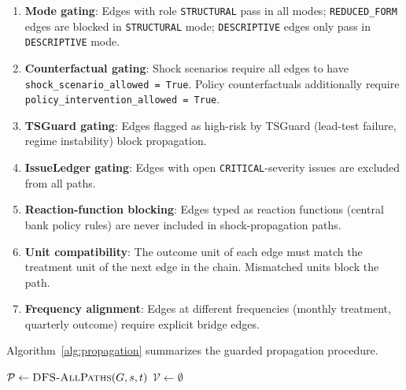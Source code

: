 \documentclass{article}
\begin{document}
\begin{enumerate}[leftmargin=*, itemsep=1pt]
    \item \textbf{Mode gating}: Edges with role \texttt{STRUCTURAL} pass in all modes; \texttt{REDUCED\_FORM} edges are blocked in \texttt{STRUCTURAL} mode; \texttt{DESCRIPTIVE} edges only pass in \texttt{DESCRIPTIVE} mode.

    \item \textbf{Counterfactual gating}: Shock scenarios require all edges to have \texttt{shock\_scenario\_allowed = True}. Policy counterfactuals additionally require \texttt{policy\_intervention\_allowed = True}.

    \item \textbf{TSGuard gating}: Edges flagged as high-risk by TSGuard (\eg lead-test failure, regime instability) block propagation.

    \item \textbf{IssueLedger gating}: Edges with open \texttt{CRITICAL}-severity issues are excluded from all paths.

    \item \textbf{Reaction-function blocking}: Edges typed as reaction functions (\eg central bank policy rules) are never included in shock-propagation paths.

    \item \textbf{Unit compatibility}: The outcome unit of each edge must match the treatment unit of the next edge in the chain. Mismatched units block the path.

    \item \textbf{Frequency alignment}: Edges at different frequencies (\eg monthly treatment, quarterly outcome) require explicit bridge edges.
\end{enumerate}

Algorithm~\ref{alg:propagation} summarizes the guarded propagation procedure.

\begin{algorithm}[t]
\caption{Guarded Effect Propagation}\label{alg:propagation}
$\mathcal{P} \gets \textsc{DFS-AllPaths}(G, s, t)$\;
$\mathcal{V} \gets \emptyset$\;
\end{algorithm}
\end{document}
